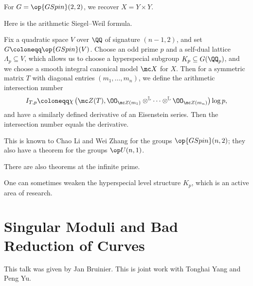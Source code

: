 \documentclass{article}
\begin{document}
\begin{example}
	For $G=\op{GSpin}(2,2)$, we recover $X=Y\times Y$.
\end{example}
Here is the arithmetic Siegel--Weil formula.
\begin{theorem}
	Fix a quadratic space $V$ over $\QQ$ of signature $(n-1,2)$, and set $G\coloneqq\op{GSpin}(V)$. Choose an odd prime $p$ and a self-dual lattice $\Lambda_p\subseteq V$, which allows us to choose a hyperspecial subgroup $K_p\subseteq G(\QQ_p)$, and we choose a smooth integral canonical model $\mc X$ for $X$. Then for a symmetric matrix $T$ with diagonal entries $(m_1,\ldots,m_n)$, we define the arithmetic intersection number
	\[I_{T,p}\coloneqq\chi\left(\mc Z(T),\OO_{\mc Z(m_1)}\otimes^{\mathbb L}\cdots\otimes^{\mathbb L}\OO_{\mc Z(m_n)}\right)\log p,\]
	and have a similarly defined derivative of an Eisenstein series. Then the intersection number equals the derivative.
\end{theorem}
This is known to Chao Li and Wei Zhang for the groups $\op{GSpin}(n,2)$; they also have a theorem for the groups $\op U(n,1)$.
\begin{remark}
	There are also theorems at the infinite prime.
\end{remark}
\begin{remark}
	One can sometimes weaken the hyperspecial level structure $K_p$, which is an active area of research.
\end{remark}

\section{Singular Moduli and Bad Reduction of Curves}
This talk was given by Jan Bruinier. This is joint work with Tonghai Yang and Peng Yu.
\end{document}
